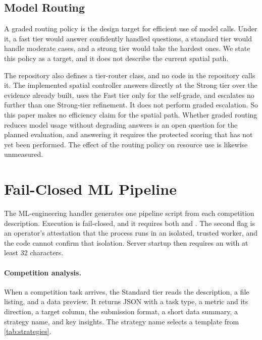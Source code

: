 \documentclass{article}
\begin{document}
\subsection{Model Routing}
\label{sec:routing}

A graded routing policy is the design target for efficient use of model calls. Under it, a fast tier would answer confidently handled questions, a standard tier would handle moderate cases, and a strong tier would take the hardest ones. We state this policy as a target, and it does not describe the current spatial path.

The repository also defines a tier-router class, and no code in the repository calls it. The implemented spatial controller answers directly at the Strong tier over the evidence already built, uses the Fast tier only for the self-grade, and escalates no further than one Strong-tier refinement. It does not perform graded escalation. So this paper makes no efficiency claim for the spatial path. Whether graded routing reduces model usage without degrading answers is an open question for the planned evaluation, and answering it requires the protected scoring that has not yet been performed. The effect of the routing policy on resource use is likewise unmeasured.

\section{Fail-Closed ML Pipeline}
\label{sec:ml}

The ML-engineering handler generates one pipeline script from each competition description. Execution is fail-closed, and it requires both  and . The second flag is an operator's attestation that the process runs in an isolated, trusted worker, and the code cannot confirm that isolation. Server startup then requires an  with at least 32 characters.

\paragraph{Competition analysis.}
When a competition task arrives, the Standard tier reads the description, a file listing, and a data preview. It returns JSON with a task type, a metric and its direction, a target column, the submission format, a short data summary, a strategy name, and key insights. The strategy name selects a template from \cref{tab:strategies}.
\end{document}
